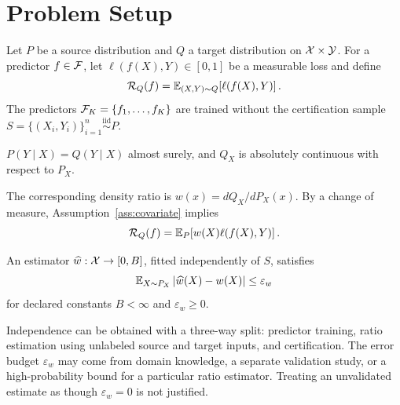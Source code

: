 \section{Problem Setup}
\label{sec:setup}

Let $P$ be a source distribution and $Q$ a target distribution on
$\mathcal{X}\times\mathcal{Y}$.  For a predictor $f\in\mathcal{F}$, let
$\ell(f(X),Y)\in[0,1]$ be a measurable loss and define
\begin{equation}
  \mathcal{R}_Q(f)=\mathbb{E}_{(X,Y)\sim Q}\!\left[\ell(f(X),Y)\right].
  \label{eq:target-risk}
\end{equation}
The predictors $\mathcal{F}_K=\{f_1,\ldots,f_K\}$ are trained without the certification
sample $S=\{(X_i,Y_i)\}_{i=1}^n\stackrel{\mathrm{iid}}{\sim}P$.

\begin{assumption}
\label{ass:covariate}
$P(Y\mid X)=Q(Y\mid X)$ almost surely, and $Q_X$ is absolutely continuous with
respect to $P_X$.
\end{assumption}

The corresponding density ratio is $w(x)=dQ_X/dP_X(x)$.  By a change of measure,
Assumption~\ref{ass:covariate} implies
\begin{equation}
  \mathcal{R}_Q(f)=\mathbb{E}_P\!\left[w(X)\ell(f(X),Y)\right].
  \label{eq:change-measure}
\end{equation}

\begin{assumption}
\label{ass:ratio}
An estimator $\widehat w:\mathcal{X}\to[0,B]$, fitted independently of $S$, satisfies
\begin{equation}
  \mathbb{E}_{X\sim P_X}\left\lvert\widehat w(X)-w(X)\right\rvert\leq \varepsilon_w
  \label{eq:ratio-error}
\end{equation}
for declared constants $B<\infty$ and $\varepsilon_w\geq0$.
\end{assumption}

Independence can be obtained with a three-way split: predictor training, ratio
estimation using unlabeled source and target inputs, and certification.  The error
budget $\varepsilon_w$ may come from domain knowledge, a separate validation study,
or a high-probability bound for a particular ratio estimator.  Treating an
unvalidated estimate as though $\varepsilon_w=0$ is not justified.
